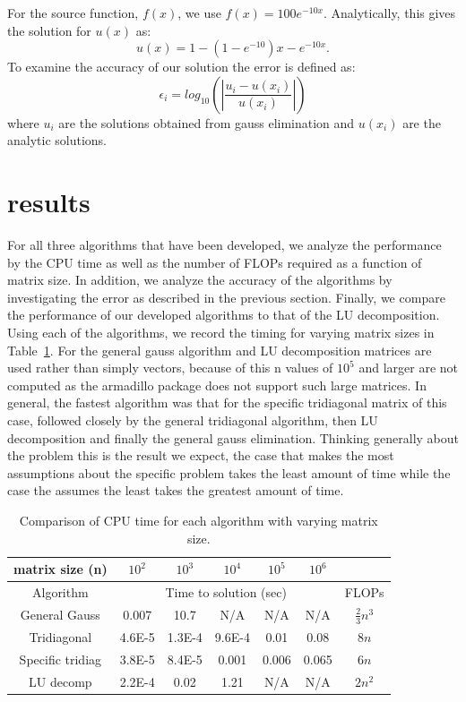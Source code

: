 \documentclass[prc,amsmath,twocolumn,superscriptaddress]{revtex4}
\begin{document}
For the source function, $f(x)$, we use $f(x)=100e^{-10x}$. Analytically, this gives the solution for $u(x)$ as:
\begin{equation}
u(x)=1-(1-e^{-10})x-e^{-10x}.
\end{equation}
To examine the accuracy of our solution the error is defined as:
\begin{equation}
\epsilon_i=log_{10}\left(\left|\frac{u_i-u(x_i)}{u(x_i)}\right|\right)
\label{error}
\end{equation}
where $u_i$ are the solutions obtained from gauss elimination and $u(x_i)$ are the analytic solutions.

\section{results}
\label{results}
For all three algorithms that have been developed, we analyze the performance by the CPU time as well as the number of FLOPs required as a function of matrix size. In addition, we analyze the accuracy of the algorithms by investigating the error as described in the previous section. Finally, we compare the performance of our developed algorithms to that of the LU decomposition. \\

Using each of the algorithms, we record the timing for varying matrix sizes in Table~\ref{time_table}. For the general gauss algorithm and LU decomposition matrices are used rather than simply vectors, because of this n values of $10^5$ and larger are not computed as the armadillo package does not support such large matrices. In general, the fastest algorithm was that for the specific tridiagonal matrix of this case, followed closely by the general tridiagonal algorithm, then LU decomposition and finally the general gauss elimination. Thinking generally about the problem this is the result we expect, the case that makes the most assumptions about the specific problem takes the least amount of time while the case the assumes the least takes the greatest amount of time.\\

\begin{table}[t]
\centering
\begin{tabular}{|c|c|c|c|c|c|c|}
\hline
matrix size (n)&$10^2$& $10^3$& $10^4$&  $10^5$& $10^6$&\\
\hline
Algorithm&\multicolumn{5}{|c|}{Time to solution (sec)}&FLOPs \\
\hline
General Gauss&0.007&10.7&N/A&N/A&N/A&$\frac{2}{3}n^3$\\
Tridiagonal &4.6E-5&1.3E-4&9.6E-4&0.01&0.08&$8n$\\
Specific tridiag&3.8E-5&8.4E-5&0.001&0.006&0.065&$6n$\\
LU  decomp&2.2E-4&0.02&1.21&N/A&N/A&$2n^2$\\
\hline
\end{tabular}
\caption{Comparison of CPU time for each algorithm with varying matrix size.}
\label{time_table}
\end{table}
\end{document}
